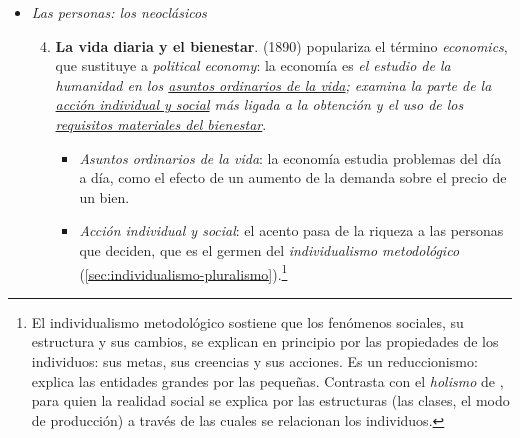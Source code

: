 \documentclass[11pt]{article}
\begin{document}
\begin{itemize}
\begin{enumerate}
\begin{itemize}
    \item \emph{Producción, distribución y consumo}: el objeto es un campo de la realidad, la riqueza material, y sus 3~fases.
    \end{itemize}
  \item \textbf{Ciencia y no arte}. , el gran metodólogo del siglo XIX, matiza a ambos: la economía política es la ciencia que traza \emph{las \uline{leyes de los fenómenos sociales} que nacen de las operaciones combinadas de la humanidad para producir riqueza, \uline{en la medida en que no los modifica la persecución de otro objeto}}\nocite{Mill1836Definition}.
    \begin{itemize}
    \item Frente a la definición 1, separa la ciencia del arte: el buen gobierno de la nación es arte, no ciencia.
    \item \emph{Leyes de los fenómenos sociales}: frente a la definición 2, deja fuera las leyes técnicas de la producción, que son de las ciencias naturales; la economía estudia solo la parte de esos fenómenos que resulta de la acción humana.
    \item \emph{En la medida en que no los modifica la persecución de otro objeto}: la economía aísla un motivo, el deseo de riqueza, y prescinde de los demás. Es el germen del \emph{homo oeconomicus} (\ref{sec:deductivo-inductivo}).
    \end{itemize}
  \end{enumerate}
\item \emph{Las personas: los neoclásicos}
  \begin{enumerate}\setcounter{enumi}{3}
  \item \textbf{La vida diaria y el bienestar}.  (1890) populariza el término \emph{economics}, que sustituye a \emph{political economy}: la economía es \emph{el estudio de la humanidad en los \uline{asuntos ordinarios de la vida}; examina la parte de la \uline{acción individual y social} más ligada a la obtención y el uso de los \uline{requisitos materiales del bienestar}}\nocite{Marshall1890Principles}.
    \begin{itemize}
    \item \emph{Asuntos ordinarios de la vida}: la economía estudia problemas del día a día, como el efecto de un aumento de la demanda sobre el precio de un bien.
    \item \emph{Acción individual y social}: el acento pasa de la riqueza a las personas que deciden, que es el germen del \emph{individualismo metodológico} (\ref{sec:individualismo-pluralismo}).\footnote{El individualismo metodológico sostiene que los fenómenos sociales, su estructura y sus cambios, se explican en principio por las propiedades de los individuos: sus metas, sus creencias y sus acciones. Es un reduccionismo: explica las entidades grandes por las pequeñas. Contrasta con el \emph{holismo} de , para quien la realidad social se explica por las estructuras (las clases, el modo de producción) a través de las cuales se relacionan los individuos.}

\end{itemize}
\end{enumerate}
\end{itemize}
\end{document}

